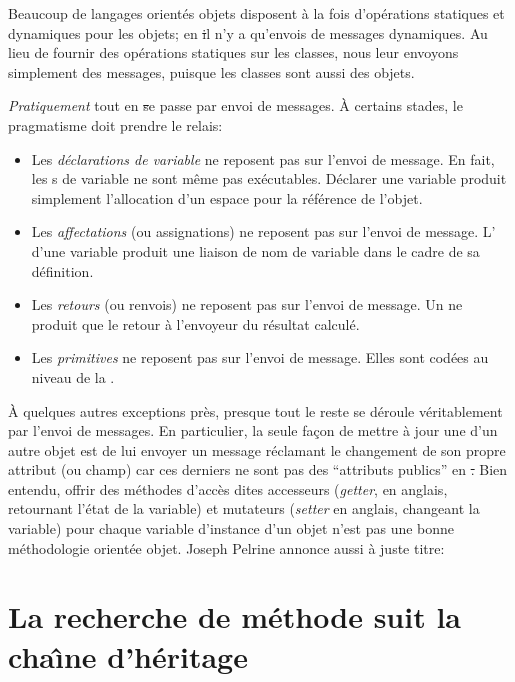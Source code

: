 \documentclass[a4paper,10pt,twoside]{book}
\begin{document}
Beaucoup de langages orient\'es objets disposent \`a la fois d'op\'erations statiques et dynamiques pour les objets; en \st il n'y a qu'envois de messages dynamiques. Au lieu de fournir des op\'erations statiques sur les classes, nous leur envoyons simplement des messages, puisque les classes sont aussi des objets. 

\emph{Pratiquement} tout en \st se passe par envoi de messages.
\`A certains stades, le pragmatisme doit prendre le relais:
\begin{itemize}
  \item Les \emph{d\'eclarations de variable} ne reposent pas sur l'envoi de message.
  		En fait, les s de variable ne sont m\^eme pas ex\'ecutables.
  		D\'eclarer une variable produit simplement l'allocation d'un espace pour la r\'ef\'erence de l'objet.
  \item Les \emph{affectations} (ou assignations) ne reposent pas sur l'envoi de message.
  		L' d'une variable produit une liaison de nom de variable dans le cadre de sa d\'efinition.
  \item Les \emph{retours} (ou renvois) ne reposent pas sur l'envoi de message.
  		Un  ne produit que le retour \`a l'envoyeur du r\'esultat calcul\'e.
  \item Les \emph{primitives} ne reposent pas sur l'envoi de message.
  		Elles sont cod\'ees au niveau de la .
\end{itemize}

\`A quelques autres exceptions pr\`es, presque tout le reste se d\'eroule v\'eritablement par l'envoi de messages. 
En particulier, la seule fa\c{c}on de mettre \`a jour une  d'un autre objet est de lui envoyer un message r\'eclamant le changement de son propre attribut (ou champ) car ces derniers ne sont pas des ``attributs publics'' en \st.
Bien entendu, offrir des m\'ethodes d'acc\`es dites accesseurs (\emph{getter}, en anglais, retournant l'\'etat de la variable) et mutateurs (\emph{setter} en anglais, changeant la variable) pour chaque variable d'instance d'un objet n'est pas une bonne m\'ethodologie orient\'ee objet.
Joseph Pelrine annonce aussi \`a juste titre:

\section{La recherche de m\'ethode suit la cha\^{\i}ne d'h\'eritage} 
\end{document}
